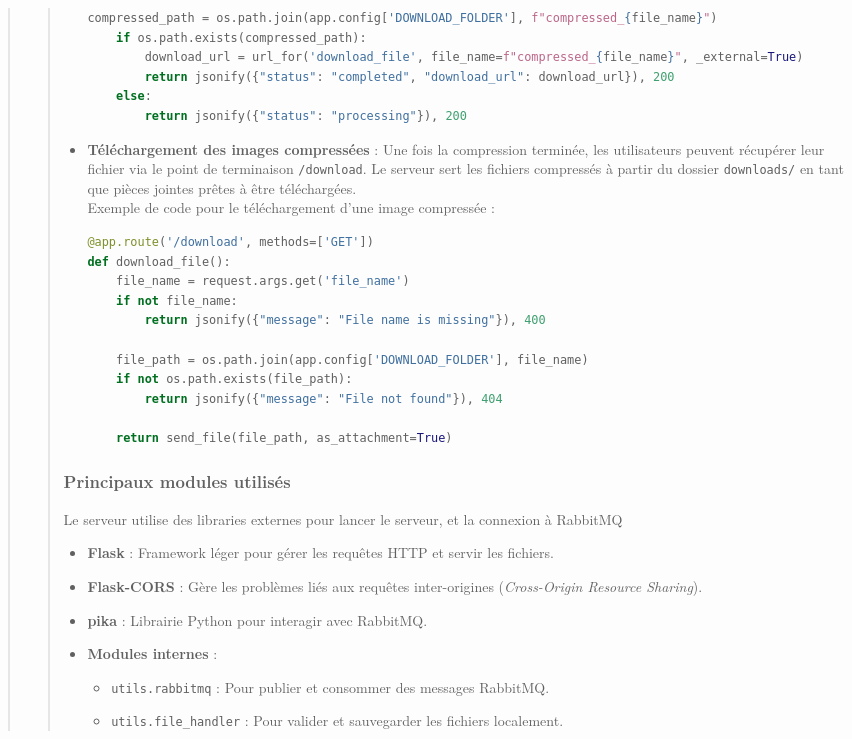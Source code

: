 \documentclass[12pt]{article}
\begin{document}
\begin{quote}
\begin{quote}
\begin{itemize}
\begin{lstlisting}[language=Python]
    compressed_path = os.path.join(app.config['DOWNLOAD_FOLDER'], f"compressed_{file_name}")
    if os.path.exists(compressed_path):
        download_url = url_for('download_file', file_name=f"compressed_{file_name}", _external=True)
        return jsonify({"status": "completed", "download_url": download_url}), 200
    else:
        return jsonify({"status": "processing"}), 200
\end{lstlisting}
\newpage
    \item \textbf{Téléchargement des images compressées} : 
    Une fois la compression terminée, les utilisateurs peuvent récupérer leur fichier via le point de terminaison \texttt{/download}. Le serveur sert les fichiers compressés à partir du dossier \texttt{downloads/} en tant que pièces jointes prêtes à être téléchargées. \\

    Exemple de code pour le téléchargement d'une image compressée : \\
\begin{lstlisting}[language=Python]
@app.route('/download', methods=['GET'])
def download_file():
    file_name = request.args.get('file_name')
    if not file_name:
        return jsonify({"message": "File name is missing"}), 400

    file_path = os.path.join(app.config['DOWNLOAD_FOLDER'], file_name)
    if not os.path.exists(file_path):
        return jsonify({"message": "File not found"}), 404

    return send_file(file_path, as_attachment=True)
    \end{lstlisting}
\end{itemize}

\subsubsection*{Principaux modules utilisés}
Le serveur utilise des libraries externes pour lancer le serveur, et la connexion à RabbitMQ \\

\begin{itemize}
    \item \textbf{Flask} : Framework léger pour gérer les requêtes HTTP et servir les fichiers.
    \item \textbf{Flask-CORS} : Gère les problèmes liés aux requêtes inter-origines (\textit{Cross-Origin Resource Sharing}).
    \item \textbf{pika} : Librairie Python pour interagir avec RabbitMQ.
    \item \textbf{Modules internes} :
    \begin{itemize}
        \item \texttt{utils.rabbitmq} : Pour publier et consommer des messages RabbitMQ.
        \item \texttt{utils.file\_handler} : Pour valider et sauvegarder les fichiers localement.
    \end{itemize}
\end{itemize}


\end{quote}
\end{quote}
\end{document}
